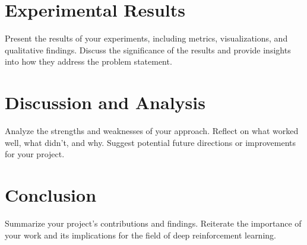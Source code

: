 \documentclass{article}
\begin{document}

\section{Experimental Results}
\label{sec:results}

    Present the results of your experiments, including metrics, visualizations, and qualitative findings. Discuss the significance of the results and provide insights into how they address the problem statement.


\section{Discussion and Analysis}
\label{sec:discussion}

    Analyze the strengths and weaknesses of your approach. Reflect on what worked well, what didn’t, and why. Suggest potential future directions or improvements for your project.


\section{Conclusion}
\label{sec:conclusion}

    Summarize your project’s contributions and findings. Reiterate the importance of your work and its implications for the field of deep reinforcement learning.


\clearpage
{}


\end{document}
